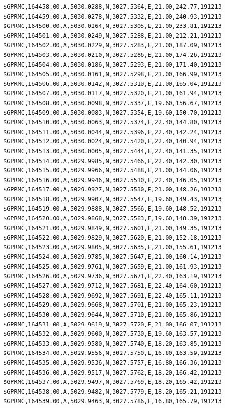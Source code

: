 \documentclass[simple,a4paper,14pt,ukrainian,utf8]{eskdtext}
\begin{document}
\begin{appendices}
\begin{small}
\begin{lstlisting}
$GPRMC,164458.00,A,5030.0288,N,3027.5364,E,21.00,242.77,191213
$GPRMC,164459.00,A,5030.0278,N,3027.5332,E,21.00,240.93,191213
$GPRMC,164500.00,A,5030.0264,N,3027.5305,E,21.00,233.81,191213
$GPRMC,164501.00,A,5030.0249,N,3027.5288,E,21.00,212.21,191213
$GPRMC,164502.00,A,5030.0229,N,3027.5283,E,21.00,187.09,191213
$GPRMC,164503.00,A,5030.0210,N,3027.5286,E,21.00,174.26,191213
$GPRMC,164504.00,A,5030.0186,N,3027.5293,E,21.00,171.40,191213
$GPRMC,164505.00,A,5030.0161,N,3027.5298,E,21.00,166.99,191213
$GPRMC,164506.00,A,5030.0142,N,3027.5310,E,21.00,165.04,191213
$GPRMC,164507.00,A,5030.0117,N,3027.5320,E,21.00,161.94,191213
$GPRMC,164508.00,A,5030.0098,N,3027.5337,E,19.60,156.67,191213
$GPRMC,164509.00,A,5030.0083,N,3027.5354,E,19.60,150.70,191213
$GPRMC,164510.00,A,5030.0063,N,3027.5374,E,22.40,144.80,191213
$GPRMC,164511.00,A,5030.0044,N,3027.5396,E,22.40,142.24,191213
$GPRMC,164512.00,A,5030.0024,N,3027.5420,E,22.40,140.94,191213
$GPRMC,164513.00,A,5030.0005,N,3027.5444,E,22.40,141.35,191213
$GPRMC,164514.00,A,5029.9985,N,3027.5466,E,22.40,142.30,191213
$GPRMC,164515.00,A,5029.9966,N,3027.5488,E,21.00,144.06,191213
$GPRMC,164516.00,A,5029.9946,N,3027.5510,E,22.40,146.05,191213
$GPRMC,164517.00,A,5029.9927,N,3027.5530,E,21.00,148.26,191213
$GPRMC,164518.00,A,5029.9907,N,3027.5547,E,19.60,149.43,191213
$GPRMC,164519.00,A,5029.9888,N,3027.5566,E,19.60,148.52,191213
$GPRMC,164520.00,A,5029.9868,N,3027.5583,E,19.60,148.39,191213
$GPRMC,164521.00,A,5029.9849,N,3027.5601,E,21.00,149.35,191213
$GPRMC,164522.00,A,5029.9829,N,3027.5620,E,21.00,152.18,191213
$GPRMC,164523.00,A,5029.9805,N,3027.5635,E,21.00,155.61,191213
$GPRMC,164524.00,A,5029.9785,N,3027.5647,E,21.00,160.14,191213
$GPRMC,164525.00,A,5029.9761,N,3027.5659,E,21.00,161.93,191213
$GPRMC,164526.00,A,5029.9736,N,3027.5671,E,22.40,163.19,191213
$GPRMC,164527.00,A,5029.9712,N,3027.5681,E,22.40,164.60,191213
$GPRMC,164528.00,A,5029.9692,N,3027.5691,E,22.40,165.11,191213
$GPRMC,164529.00,A,5029.9668,N,3027.5701,E,21.00,165.23,191213
$GPRMC,164530.00,A,5029.9644,N,3027.5710,E,21.00,165.86,191213
$GPRMC,164531.00,A,5029.9619,N,3027.5720,E,21.00,166.07,191213
$GPRMC,164532.00,A,5029.9600,N,3027.5730,E,19.60,163.57,191213
$GPRMC,164533.00,A,5029.9580,N,3027.5740,E,18.20,163.85,191213
$GPRMC,164534.00,A,5029.9556,N,3027.5750,E,16.80,163.59,191213
$GPRMC,164535.00,A,5029.9536,N,3027.5757,E,16.80,166.36,191213
$GPRMC,164536.00,A,5029.9517,N,3027.5762,E,18.20,166.42,191213
$GPRMC,164537.00,A,5029.9497,N,3027.5769,E,18.20,165.42,191213
$GPRMC,164538.00,A,5029.9482,N,3027.5779,E,18.20,165.21,191213
$GPRMC,164539.00,A,5029.9463,N,3027.5786,E,16.80,165.79,191213

\end{lstlisting}
\end{small}
\end{appendices}
\end{document}
